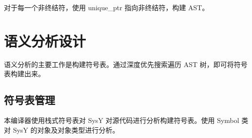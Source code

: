 \documentclass[a4paper]{article}
\begin{document}
        对于每一个非终结符，使用 unique\_ptr 指向非终结符，构建 AST。
			
	\section{语义分析设计}
	
		语义分析的主要工作是构建符号表。通过深度优先搜索遍历 AST 树，即可将符号表构建出来。

		\subsection{符号表管理}

		    本编译器使用栈式符号表对 SysY 对源代码进行分析构建符号表。使用 Symbol 类对 SysY 的对象及对象类型进行分析。

	
	
	
	
	
	
\end{document}
